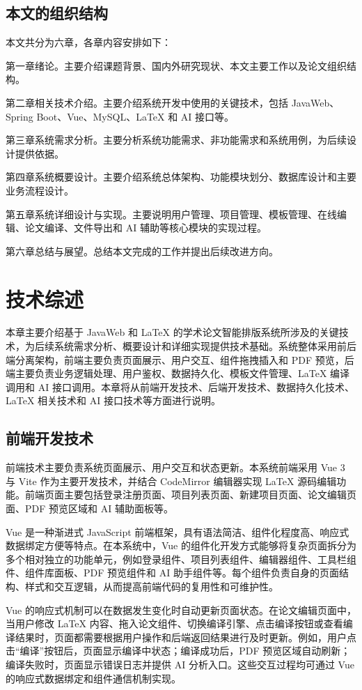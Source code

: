 \documentclass{xduugthesis}
\begin{document}
\section{本文的组织结构}
本文共分为六章，各章内容安排如下：

第一章绪论。主要介绍课题背景、国内外研究现状、本文主要工作以及论文组织结构。

第二章相关技术介绍。主要介绍系统开发中使用的关键技术，包括 JavaWeb、Spring Boot、Vue、MySQL、LaTeX 和 AI 接口等。

第三章系统需求分析。主要分析系统功能需求、非功能需求和系统用例，为后续设计提供依据。

第四章系统概要设计。主要介绍系统总体架构、功能模块划分、数据库设计和主要业务流程设计。

第五章系统详细设计与实现。主要说明用户管理、项目管理、模板管理、在线编辑、论文编译、文件导出和 AI 辅助等核心模块的实现过程。

第六章总结与展望。总结本文完成的工作并提出后续改进方向。

\chapter{技术综述}
本章主要介绍基于 JavaWeb 和 LaTeX 的学术论文智能排版系统所涉及的关键技术，为后续系统需求分析、概要设计和详细实现提供技术基础。系统整体采用前后端分离架构，前端主要负责页面展示、用户交互、组件拖拽插入和 PDF 预览，后端主要负责业务逻辑处理、用户鉴权、数据持久化、模板文件管理、LaTeX 编译调用和 AI 接口调用。本章将从前端开发技术、后端开发技术、数据持久化技术、LaTeX 相关技术和 AI 接口技术等方面进行说明。

\section{前端开发技术}
前端技术主要负责系统页面展示、用户交互和状态更新。本系统前端采用 Vue 3 与 Vite 作为主要开发技术，并结合 CodeMirror 编辑器实现 LaTeX 源码编辑功能。前端页面主要包括登录注册页面、项目列表页面、新建项目页面、论文编辑页面、PDF 预览区域和 AI 辅助面板等。

Vue 是一种渐进式 JavaScript 前端框架，具有语法简洁、组件化程度高、响应式数据绑定方便等特点\cite{macrae2018vue}。在本系统中，Vue 的组件化开发方式能够将复杂页面拆分为多个相对独立的功能单元，例如登录组件、项目列表组件、编辑器组件、工具栏组件、组件库面板、PDF 预览组件和 AI 助手组件等。每个组件负责自身的页面结构、样式和交互逻辑，从而提高前端代码的复用性和可维护性。

Vue 的响应式机制可以在数据发生变化时自动更新页面状态。在论文编辑页面中，当用户修改 LaTeX 内容、拖入论文组件、切换编译引擎、点击编译按钮或查看编译结果时，页面都需要根据用户操作和后端返回结果进行及时更新。例如，用户点击“编译”按钮后，页面显示编译中状态；编译成功后，PDF 预览区域自动刷新；编译失败时，页面显示错误日志并提供 AI 分析入口。这些交互过程均可通过 Vue 的响应式数据绑定和组件通信机制实现。
\end{document}
